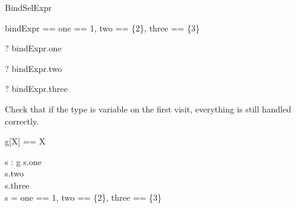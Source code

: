 \begin{zsection}
  \SECTION BindSelExpr
\end{zsection}

\begin{zed}
  bindExpr == \lblot one == 1, two == \{2\}, three == \power \{3\} \rblot
\end{zed}

\begin{zed} \vdash? bindExpr.one \in \nat \end{zed}
\begin{zed} \vdash? bindExpr.two \in \power \nat \end{zed}
\begin{zed} \vdash? bindExpr.three \in \power \power \nat \end{zed}

Check that if the type is variable on the first visit, everything is 
still handled correctly.

\begin{zed}
  g[X] == X
\end{zed}

\begin{axdef}
  s : g
\where
  s.one \in \nat\\
  s.two \in \power \nat\\
  s.three \in \power \power \nat\\
  s = \lblot one == 1, two == \{2\}, three == \power \{3\} \rblot
\end{axdef}
